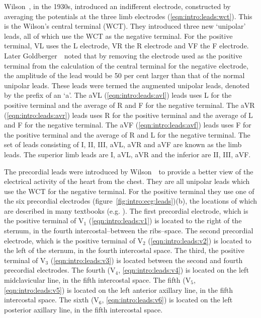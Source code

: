 Wilson~\cite{Wilson1934}, in the 1930s, introduced an indifferent
electrode,  constructed by averaging the potentials at the three limb
electrodes (\ref{eqn:intro:leads:wct}).
This is the Wilson's central terminal (WCT).
They introduced three new `unipolar' leads, all of which use the WCT as the
negative terminal.
For the positive terminal, VL uses the L electrode, VR the R electrode and VF
the F electrode.
Later Goldberger~\cite{Goldberger1942}\ noted that by removing the electrode used
as the positive terminal from the calculation of the central terminal for the
negative electrode, the amplitude of the lead would be 50 per cent larger than
that of the normal unipolar leads.
These leads were termed the augmented unipolar leads, denoted by the prefix of
an `a'.
The aVL (\ref{eqn:intro:leads:avl}) leads uses L for the positive terminal and
the average of R and F for the negative terminal.
The aVR (\ref{eqn:intro:leads:avr}) leads uses R for the positive terminal and
the average of L and F for the negative terminal.
The aVF (\ref{eqn:intro:leads:avf}) leads uses F for the positive terminal and
the average of R and L for the negative terminal.
The set of leads consisting of I, II, III, aVL, aVR and aVF are known as the
limb leads.
The superior limb leads are I, aVL, aVR and the inferior are II, III, aVF.

The precordial leads were introduced by Wilson~\cite{Wilson1944}\ to provide a
better view of the electrical activity of the heart from the chest.
They are all unipolar leads which use the WCT for the negative
terminal.
For the positive terminal they use one of the six precordial electrodes
(figure~\ref{fig:intro:ecg:leads})(b), the locations of which are described in
many textbooks (e.g.  \cite{Hampton2008}).
The first precordial electrode, which is the positive terminal of
$\text{V}_{\text{1}}$ (\ref{eqn:intro:leads:v1}) is located to the right of the
sternum, in the fourth intercostal--between the ribs--space.
The second precordial electrode, which is the positive terminal of
$\text{V}_{\text{2}}$ (\ref{eqn:intro:leads:v2}) is located to the left of the
sternum, in the fourth intercostal space.
The third, the positive terminal of $\text{V}_{\text{3}}$
(\ref{eqn:intro:leads:v3}) is located between the second and fourth precordial
electrodes.
The fourth ($\text{V}_{\text{4}}$, \ref{eqn:intro:leads:v4}) is located on the
left midclavicular line, in the fifth intercostal space.
The fifth ($\text{V}_{\text{5}}$, \ref{eqn:intro:leads:v5}) is located on the
left anterior axillary line, in the fifth intercostal space.
The sixth ($\text{V}_{\text{6}}$, \ref{eqn:intro:leads:v6}) is located on the
left posterior axillary line, in the fifth intercostal space.

